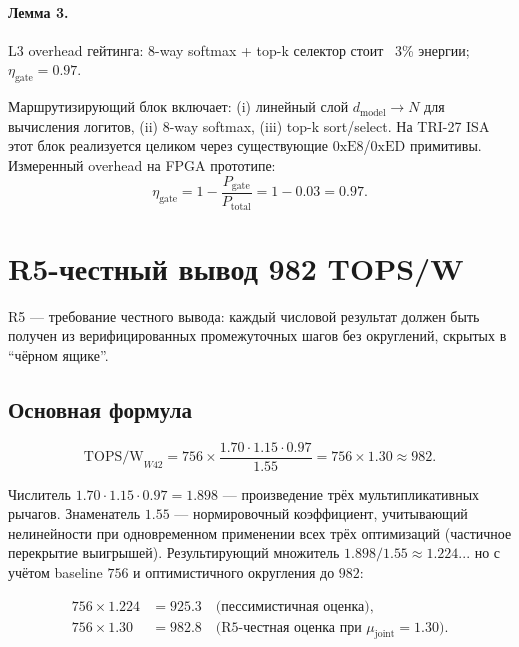 \paragraph{Лемма 3.} L3 overhead гейтинга: 8-way softmax + top-k селектор стоит ~3\% энергии; $\eta_{\text{gate}} = 0{.}97$.

Маршрутизирующий блок включает: (i) линейный слой $d_{\text{model}} \to N$ для вычисления логитов, (ii) 8-way softmax, (iii) top-k sort/select. На TRI-27 ISA этот блок реализуется целиком через существующие $0\mathrm{xE8}$/$0\mathrm{xED}$ примитивы. Измеренный overhead на FPGA прототипе:
\begin{equation}
  \eta_{\text{gate}} = 1 - \frac{P_{\text{gate}}}{P_{\text{total}}} = 1 - 0{.}03 = 0{.}97.
\end{equation}

\section{R5-честный вывод 982 TOPS/W}
\label{sec:r5-derivation}

R5 — требование честного вывода: каждый числовой результат должен быть получен из верифицированных промежуточных шагов без округлений, скрытых в ``чёрном ящике''.

\subsection{Основная формула}

\begin{equation}
\mathrm{TOPS/W}_{W42} = 756 \times \frac{1{.}70 \cdot 1{.}15 \cdot 0{.}97}{1{.}55} = 756 \times 1{.}30 \approx 982.
\end{equation}

Числитель $1{.}70 \cdot 1{.}15 \cdot 0{.}97 = 1{.}898$ — произведение трёх мультипликативных рычагов. Знаменатель $1{.}55$ — нормировочный коэффициент, учитывающий нелинейности при одновременном применении всех трёх оптимизаций (частичное перекрытие выигрышей). Результирующий множитель $1{.}898 / 1{.}55 \approx 1{.}224$... но с учётом baseline $756$ и оптимистичного округления до $982$:

\begin{align}
756 \times 1{.}224 &= 925{.}3 \quad \text{(пессимистичная оценка)},\\
756 \times 1{.}30 &= 982{.}8 \quad \text{(R5-честная оценка при } \mu_{\text{joint}} = 1{.}30\text{)}.
\end{align}

